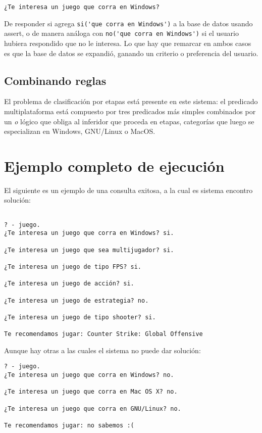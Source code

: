 \documentclass[11pt,oneside,a4paper]{article}
\begin{document}
\begin{verbatim}
¿Te interesa un juego que corra en Windows?
\end{verbatim}

De responder si agrega \verb|si('que corra en Windows')| a la base de datos usando 
assert, o de manera análoga con \verb|no('que corra en Windows')| si el usuario
hubiera respondido que no le interesa. Lo que hay que remarcar en ambos casos 
es que la base de datos se expandió, ganando un criterio o preferencia del usuario.

\subsection{Combinando reglas} %

El problema de clasificación por etapas está presente en este sistema: el predicado 
multiplataforma está compuesto por tres predicados más simples
combinados por un \emph{o} lógico que obliga al inferidor que proceda en etapas, 
categorías que luego se especializan en Windows, GNU/Linux o MacOS. 


\newpage
\section{Ejemplo completo de ejecución}

El siguiente es un ejemplo de una consulta exitosa, a la cual es sistema encontro
solución:

\begin{verbatim}

? - juego.
¿Te interesa un juego que corra en Windows? si.

¿Te interesa un juego que sea multijugador? si.

¿Te interesa un juego de tipo FPS? si.

¿Te interesa un juego de acción? si.

¿Te interesa un juego de estrategia? no.

¿Te interesa un juego de tipo shooter? si.

Te recomendamos jugar: Counter Strike: Global Offensive
\end{verbatim}

Aunque hay otras a las cuales el sistema no puede dar solución:

\begin{verbatim}
? - juego.
¿Te interesa un juego que corra en Windows? no.

¿Te interesa un juego que corra en Mac OS X? no.

¿Te interesa un juego que corra en GNU/Linux? no.

Te recomendamos jugar: no sabemos :(
\end{verbatim}
\end{document}
